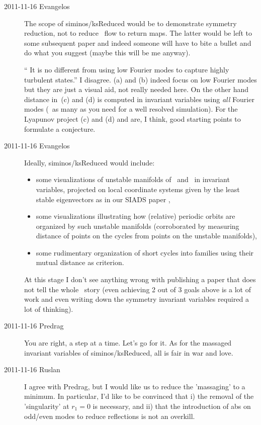 \begin{description}
\item[2011-11-16 Evangelos] The scope of siminos/ksReduced would be to
demonstrate symmetry reduction, not to reduce \KS\ flow to return maps.
The latter would be left to some subsequent paper and indeed someone will have
to bite a bullet and do what you suggest (maybe this will be me anyway).

`` It is no different from using low Fourier modes to capture
highly turbulent states.'' I disagree. (a)
and (b) indeed focus on low Fourier modes but they are just a visual aid,
not really needed here. On the other hand distance in
\,(c) and (d) is computed in invariant variables using
\emph{all} Fourier modes (\ie\ as many as you need for a well resolved
simulation). For the Lyapunov project (c) and (d)
and  are, I think, good starting points to formulate
a conjecture.

\item[2011-11-16 Evangelos]
Ideally, siminos/ksReduced would include:
\begin{itemize}
 \item some visualizations of unstable manifolds of \eqva\ and \reqva\
	in invariant variables, projected on local coordinate systems
	given by the least stable eigenvectors as in our
	SIADS paper ,
 \item some visualizations illustrating how (relative) periodic orbits are
	organized by such unstable manifolds (corroborated by measuring distance
	of points on the cycles from points on the unstable manifolds),
 \item some rudimentary organization of short cycles into families using
	their mutual distance as criterion.
\end{itemize}

At this stage I don't see anything wrong with publishing a paper that does
not tell the whole \KS\ story (even achieving 2 out of 3 goals above is a lot
of work and even writing down the symmetry invariant variables required a lot
of thinking).

\item[2011-11-16 Predrag] You are right, a step at a time. Let's go for
it. As for the massaged invariant variables of siminos/ksReduced, all is
fair in war and love.

\item[2011-11-16 Ruslan] I agree with Predrag, but I would like us to reduce the 'massaging' to a minimum.  In particular, I'd like to be convinced that i) the removal of the 'singularity' at $r_1 = 0$ is necessary, and ii) that the introduction of abs on odd/even modes to reduce reflections is not an overkill.  
    

\end{description}
